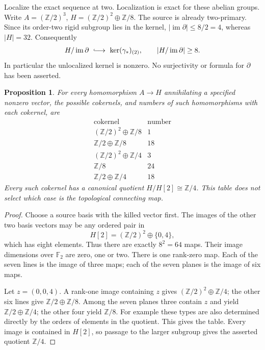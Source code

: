 \documentclass[11pt]{article}
\newtheorem{proposition}[theorem]{Proposition}
\theoremstyle{remark}
\newcommand{\Z}{\mathbb Z}
\newcommand{\im}{\operatorname{im}}
\begin{document}
Localize the exact sequence at two. Localization is exact for these
abelian groups. Write \(A=(\Z/2)^3\), \(H=(\Z/2)^2\oplus\Z/8\).
The source is already two-primary. Since its order-two rigid
subgroup lies in the kernel, \(|\im\partial|\leq8/2=4\), whereas
\(|H|=32\). Consequently
\begin{equation}\label{eq:kernel-bound}
 H/\im\partial\ \lhook\joinrel\longrightarrow\
       \ker(\gamma_*)_{(2)},\qquad |H/\im\partial|\geq8.
\end{equation}
In particular the unlocalized kernel is nonzero. No surjectivity
or formula for \(\partial\) has been asserted.

\begin{proposition}\label{prop:universal}
For every homomorphism \(A\to H\) annihilating a specified nonzero
vector, the possible cokernels, and numbers of such homomorphisms
with each cokernel, are
\[
\begin{array}{c|r}
\text{cokernel}&\text{number}\\ \hline
 (\Z/2)^2\oplus\Z/8&1\\
 \Z/2\oplus\Z/8&18\\
 (\Z/2)^2\oplus\Z/4&3\\
 \Z/8&24\\
 \Z/2\oplus\Z/4&18
\end{array}
\]
Every such cokernel has a canonical quotient
\(H/H[2]\cong\Z/4\). This table does not select which case is the
topological connecting map.
\end{proposition}
\begin{proof}
Choose a source basis with the killed vector first. The images of
the other two basis vectors may be any ordered pair in
\[
 H[2]=(\Z/2)^2\oplus\{0,4\},
\]
which has eight elements. Thus there are exactly \(8^2=64\) maps.
Their image dimensions over \(\mathbb F_2\) are zero, one or two.
There is one rank-zero map. Each of the seven lines is the image
of three maps; each of the seven planes is the image of six maps.

Let \(z=(0,0,4)\). A rank-one image containing \(z\) gives
\((\Z/2)^2\oplus\Z/4\); the other six lines give
\(\Z/2\oplus\Z/8\). Among the seven planes three contain \(z\)
and yield \(\Z/2\oplus\Z/4\); the other four yield \(\Z/8\).
For example these types are also determined directly by the orders
of elements in the quotient. This gives the table.
Every image is contained in \(H[2]\), so passage to the larger
subgroup gives the asserted quotient \(\Z/4\).
\end{proof}
\end{document}
